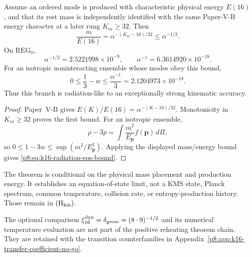 \documentclass[12pt,a4paper]{article}
\begin{document}
\begin{theorem}
\label{p8:thm:k16-produced-modes-radiation-like}
Assume an ordered mode is produced with characteristic physical energy
\(E(16)\), and that its rest mass is independently identified with the same
Paper-V-B energy character at a later rung \(K_m\ge32\).  Then
\begin{equation}
\label{p8:eq:k16-mass-energy-suppression}
 \boxed{\frac{m}{E(16)}
 =\alpha^{-(K_m-16)/32}
 \le\alpha^{-1/2}.}
\end{equation}
On \(\mathrm{REG}_0\),
\begin{equation}
\label{p8:eq:k16-mass-energy-suppression-numeric}
 \alpha^{-1/2}=2.5221998\times10^{-9},\qquad
 \alpha^{-1}=6.3614920\times10^{-18}.
\end{equation}
For an isotropic noninteracting ensemble whose modes obey this bound,
\begin{equation}
\label{p8:eq:k16-radiation-eos-bound}
 \boxed{0\le\frac13-w
 \le\frac{\alpha^{-1}}3
 =2.1204973\times10^{-18}.}
\end{equation}
Thus this branch is radiation-like to an exceptionally strong kinematic
accuracy.
\end{theorem}

\begin{proof}
Paper~V-B gives \(E(K)/E(16)=\alpha^{-(K-16)/32}\).  Monotonicity in
\(K_m\ge32\) proves the first bound.  For an isotropic ensemble,
\[
 \rho-3p=\int \frac{m^2}{E_{\boldsymbol p}}f(\boldsymbol p)\,d\Pi,
\]
so \(0\le1-3w\le\sup(m^2/E_{\boldsymbol p}^2)\).  Applying the displayed
mass/energy bound gives \eqref{p8:eq:k16-radiation-eos-bound}.
\end{proof}

\begin{remark}
\label{p8:rem:radiation-like-not-thermalized}
The theorem is conditional on the physical mass placement and production
energy.  It establishes an equation-of-state limit, not a KMS state,
Planck spectrum, common temperature, collision rate, or entropy-production
history.  Those remain in \((\mathrm H_{\rm kin})\).
\end{remark}

\begin{remark}
\label{p8:cor:direct-k16-delta-diagnostic}
The optional comparison
\(\xi_{16}^{\rm dyn}=\delta_{\rm geom}=(8\cdot9)^{-1/2}\) and its numerical
temperature evaluation are not part of the positive reheating theorem chain.
They are retained with the transition counterfamilies in
Appendix~\ref{p8:app:k16-transfer-coefficient-no-go}.
\end{remark}
\end{document}
